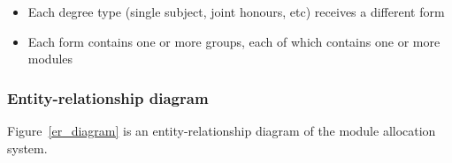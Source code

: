 \begin{itemize}
  \item Each degree type (single subject, joint honours, etc) receives a different form
  \item Each form contains one or more groups, each of which contains one or more modules
\end{itemize}

\subsubsection{Entity-relationship diagram}

Figure~\ref{er_diagram} is an entity-relationship diagram of the module
allocation system.


